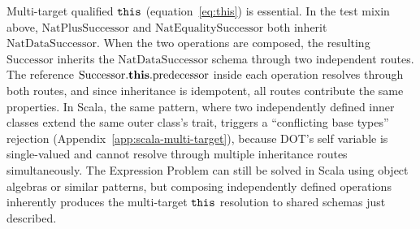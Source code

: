 Multi-target qualified $\mathtt{this}$ (equation~\ref{eq:this}) is essential.
In the test mixin above, $\mathrm{NatPlusSuccessor}$ and
$\mathrm{NatEqualitySuccessor}$ both inherit
$\mathrm{NatDataSuccessor}$.
When the two operations are composed, the resulting
$\mathrm{Successor}$ inherits the $\mathrm{NatDataSuccessor}$ schema
through two independent routes.
The reference
$\mathrm{Successor}.\mathbf{this}.\mathrm{predecessor}$
inside each operation resolves through both routes, and since
inheritance is idempotent, all routes contribute the same
properties.
In Scala, the same pattern, where two independently defined inner
classes extend the same outer class's trait, triggers a
``conflicting base types'' rejection
(Appendix~\ref{app:scala-multi-target}), because DOT's self variable
is single-valued and cannot resolve through multiple inheritance
routes simultaneously.
The Expression Problem can still be solved in Scala using
object algebras or similar patterns, but composing independently
defined operations inherently produces the multi-target $\mathtt{this}$
resolution to shared schemas just described.

